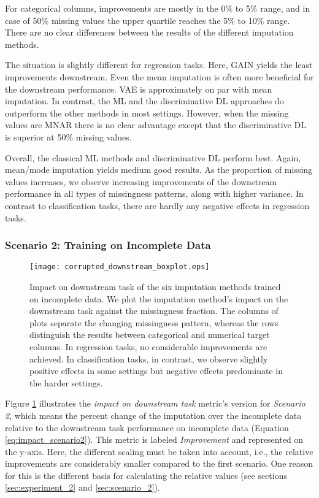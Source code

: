 For categorical columns, improvements are mostly in the 0\% to 5\% range, and in case of 50\% missing values the upper quartile reaches the 5\% to 10\% range. There are no clear differences between the results of the different imputation methods.

The situation is slightly different for regression tasks. Here, GAIN yields the least improvements downstream. Even the mean imputation is often more beneficial for the downstream performance. VAE is approximately on par with mean imputation. In contrast, the ML and the discriminative DL approaches do outperform the other methods in most settings. However, when the missing values are MNAR there is no clear advantage except that the discriminative DL is superior at 50\% missing values.

Overall, the classical ML methods and discriminative DL perform best. Again, mean/mode imputation yields medium good results. As the proportion of missing values increases, we observe increasing improvements of the downstream performance in all types of missingness patterns, along with higher variance. In contrast to classification tasks, there are hardly any negative effects in regression tasks.


\subsubsection{Scenario 2: Training on Incomplete Data}

\begin{figure}\centering
	\texttt{[image: corrupted\_downstream\_boxplot.eps]}

	\caption[Downstream Ranks - Corrupted]{Impact on downstream task of the six imputation methods trained on incomplete data. We plot the imputation method's impact on the downstream task against the missingness fraction. The columns of plots separate the changing missingness pattern, whereas the rows distinguish the results between categorical and numerical target columns. In regression tasks, no considerable improvements are achieved. In classification tasks, in contrast, we observe slightly positive effects in some settings but negative effects predominate in the harder settings.
    }
	\label{fig:corrupted_downstream_boxplot}
\end{figure}

Figure \ref{fig:corrupted_downstream_boxplot} illustrates the \textit{impact on downstream task} metric's version for \textit{Scenario 2}, which means the percent change of the imputation over the incomplete data relative to the downstream task performance on incomplete data (Equation \ref{eq:impact_scenario2}). This metric is labeled \textit{Improvement} and represented on the y-axis. Here, the different scaling must be taken into account, i.e., the relative improvements are considerably smaller compared to the first scenario. One reason for this is the different basis for calculating the relative values (see sections \ref{sec:experiment_2} and \ref{sec:scenario_2}).

